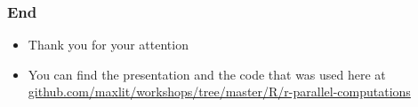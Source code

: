 \documentclass[bigger]{beamer}
\begin{document}
\begin{frame}
\frametitle{End}
\label{sec-3-18}
\begin{itemize}

\item Thank you for your attention
\label{sec-3-18-1}%

\item You can find the presentation and the code that was used here at\\
\label{sec-3-18-2}%
\hyperref[github.com-maxlit-workshops-tree-master-R-r-parallel-computations]{github.com/maxlit/workshops/tree/master/R/r-parallel-computations}
\end{itemize} %
\end{frame}
\end{document}
